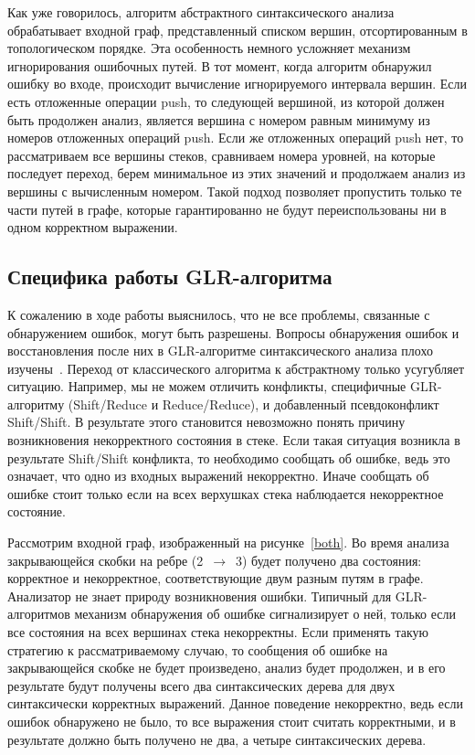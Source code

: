 Как уже говорилось, алгоритм абстрактного синтаксического анализа обрабатывает 
входной граф, представленный списком вершин, отсортированным в топологическом 
порядке. Эта особенность немного усложняет механизм игнорирования ошибочных путей. 
В тот момент, когда алгоритм обнаружил ошибку во входе, происходит вычисление 
игнорируемого интервала вершин. Если есть отложенные операции push, то следующей 
вершиной, из которой должен быть продолжен анализ, является вершина с номером 
равным минимуму из номеров отложенных операций push. Если же отложенных операций 
push нет, то рассматриваем все вершины стеков, сравниваем номера уровней, на 
которые последует переход, берем минимальное из этих значений и продолжаем анализ 
из вершины с вычисленным номером. Такой подход позволяет пропустить только те 
части путей в графе, которые гарантированно не будут переиспользованы ни в одном 
корректном выражении. 

\subsection{Специфика работы GLR-алгоритма}
К сожалению в ходе работы выяснилось, что не все проблемы, связанные с обнаружением 
ошибок, могут быть разрешены. Вопросы обнаружения ошибок и восстановления после 
них в GLR-алгоритме синтаксического анализа плохо изучены~\cite{economopoulos2006generalised}. Переход от классического 
алгоритма к абстрактному только усугубляет ситуацию. Например, мы не можем отличить 
конфликты, специфичные GLR-алгоритму (Shift/Reduce и Reduce/Reduce), и добавленный 
псевдоконфликт Shift/Shift. В результате этого становится невозможно понять причину 
возникновения некорректного состояния в стеке. Если такая ситуация возникла в 
результате Shift/Shift конфликта, то необходимо сообщать об ошибке, ведь это 
означает, что одно из входных выражений некорректно. Иначе сообщать об ошибке 
стоит только если на всех верхушках стека наблюдается некорректное состояние. 

Рассмотрим входной граф, изображенный на рисунке~\ref{both}. Во время анализа закрывающейся 
скобки на ребре (2~$\to$~3) будет получено два состояния: корректное и некорректное, 
соответствующие двум разным путям в графе. Анализатор не знает природу возникновения 
ошибки. Типичный для GLR-алгоритмов механизм обнаружения об ошибке сигнализирует 
о ней, только если все состояния на всех вершинах стека некорректны. Если применять 
такую стратегию к рассматриваемому случаю, то сообщения об ошибке на закрывающейся 
скобке не будет произведено, анализ будет продолжен, и в его результате будут 
получены всего два синтаксических дерева для двух синтаксически корректных выражений. 
Данное поведение некорректно, ведь если ошибок обнаружено не было, то все выражения 
стоит считать корректными, и в результате должно быть получено не два, а четыре 
синтаксических дерева.

